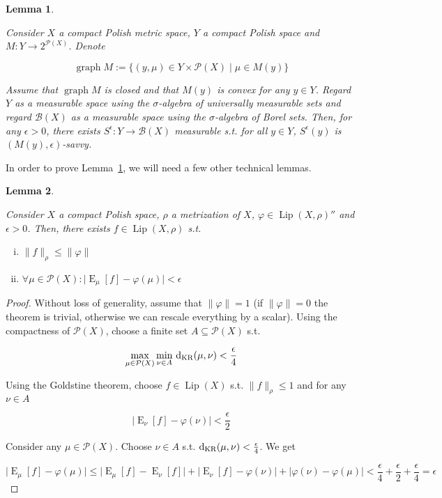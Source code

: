 \documentclass[11pt]{article}
\theoremstyle{definition}
\theoremstyle{plain}
\newtheorem{lemma}{Lemma}%
\newcommand{\A}[1]{\lvert #1 \rvert}
\newcommand{\N}[1]{\lVert #1 \rVert}
\DeclareMathOperator{\E}{E}
\DeclareMathOperator{\Gr}{graph}
\newcommand{\PM}{\mathcal{P}}
\newcommand{\Lp}{{\operatorname{Lip}}}
\newcommand{\DKR}{\operatorname{d}_{\textnormal{KR}}}
\newcommand{\Gm}{\mathcal{B}}
\begin{document}
\begin{samepage}
\begin{lemma}
\label{lmm:savvy}

Consider $X$ a compact Polish metric space, $Y$ a compact Polish space and $M: Y \rightarrow 2^{\PM(X)}$. Denote

\begin{equation*}
\Gr{M}:=\{(y, \mu) \in Y \times \PM(X) \mid \mu \in M(y)\}
\end{equation*}

Assume that $\Gr{M}$ is closed and that $M(y)$ is convex for any $y \in Y$. Regard $Y$ as a measurable space using the $\sigma$-algebra of universally measurable sets and regard $\Gm(X)$ as a measurable space using the $\sigma$-algebra of Borel sets. Then, for any $\epsilon > 0$, there exists $S^\epsilon: Y \rightarrow \Gm(X)$ measurable s.t. for all $y \in Y$, $S^\epsilon(y)$ is $(M(y),\epsilon)$-savvy.

\end{lemma}
\end{samepage}

In order to prove Lemma~\ref{lmm:savvy}, we will need a few other technical lemmas.

\begin{samepage}
\begin{lemma}
\label{lmm:double_dual}

Consider $X$ a compact Polish space, $\rho$ a metrization of $X$, $\varphi \in \Lp(X,\rho)''$ and $\epsilon > 0$. Then, there exists $f \in \Lp(X,\rho)$ s.t.

\begin{enumerate}[i.]

\item $\N{f}_\rho \leq \N{\varphi}$
\item $\forall \mu \in \PM(X): \A{\E_\mu[f] - \varphi(\mu)} < \epsilon$

\end{enumerate}

\end{lemma}
\end{samepage}

\begin{proof}

Without loss of generality, assume that $\N{\varphi}=1$ (if $\N{\varphi}=0$ the theorem is trivial, otherwise we can rescale everything by a scalar). Using the compactness of $\PM(X)$, choose a finite set $A \subseteq \PM(X)$ s.t. 

$$\max_{\mu \in \PM(X)} \min_{\nu \in A}\, \DKR(\mu,\nu) < \frac{\epsilon}{4}$$

Using the Goldstine theorem, choose $f \in \Lp(X)$ s.t. $\N{f}_\rho \leq 1$ and for any $\nu \in A$ 

$$\A{\E_\nu[f] - \varphi(\nu)} < \frac{\epsilon}{2}$$

Consider any $\mu \in \PM(X)$. Choose $\nu \in A$ s.t. $\DKR(\mu,\nu) < \frac{\epsilon}{4}$. We get

$$\A{\E_\mu[f] - \varphi(\mu)} \leq \A{\E_\mu[f] - \E_\nu[f]} + \A{\E_\nu[f] - \varphi(\nu)} + \A{\varphi(\nu) - \varphi(\mu)} < \frac{\epsilon}{4} + \frac{\epsilon}{2} + \frac{\epsilon}{4} = \epsilon$$
\end{proof}
\end{document}
